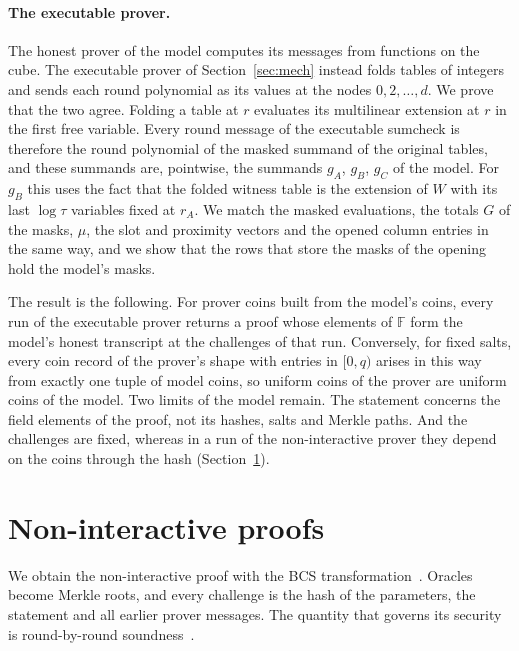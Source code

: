\documentclass[sigconf,anonymous]{acmart}
\newcommand{\F}{\mathbb{F}}
\begin{document}
\paragraph{The executable prover.}
The honest prover of the model computes its messages from functions on the cube. The executable
prover of Section~\ref{sec:mech} instead folds tables of integers and sends each round polynomial
as its values at the nodes $0,2,\dots,d$. We prove that the two agree. Folding a table at $r$
evaluates its multilinear extension at $r$ in the first free variable. Every round message of the
executable sumcheck is therefore the round polynomial of the masked summand of the original tables,
and these summands are, pointwise, the summands $g_A$, $g_B$, $g_C$ of the model. For $g_B$ this
uses the fact that the folded witness table is the extension of $W$ with its last $\log\tau$
variables fixed at $r_A$. We match the masked evaluations, the totals $G$ of the masks, $\mu$, the
slot and proximity vectors and the opened column entries in the same way, and we show that the rows
that store the masks of the opening hold the model's masks.

The result is the following. For prover coins built from the model's coins, every run of the
executable prover returns a proof whose elements of $\F$ form the model's honest transcript at the
challenges of that run. Conversely, for fixed salts, every coin record of the prover's shape with
entries in $[0,q)$ arises in this way from exactly one tuple of model coins, so uniform coins of the
prover are uniform coins of the model. Two limits of the model remain. The statement concerns the
field elements of the proof, not its hashes, salts and Merkle paths. And the challenges are fixed,
whereas in a run of the non-interactive prover they depend on the coins through the hash
(Section~\ref{sec:fs}).

\section{Non-interactive proofs}
\label{sec:fs}

We obtain the non-interactive proof with the BCS transformation~\cite{BCS16}. Oracles become Merkle
roots, and every challenge is the hash of the parameters, the statement and all earlier prover
messages. The quantity that governs its security is round-by-round soundness~\cite{Hol19}.
\end{document}
